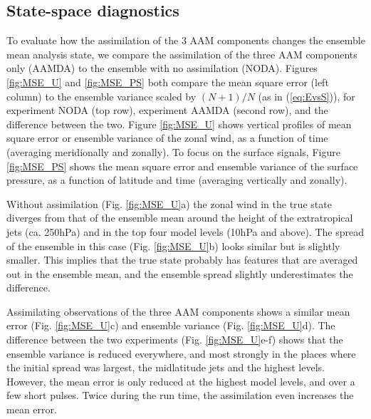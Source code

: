 \subsection{State-space diagnostics}
\label{sec:erpda}

To evaluate how the assimilation of the 3 AAM components changes the ensemble mean analysis state, we compare the assimilation of the three AAM components only (AAMDA) to the ensemble with no assimilation (NODA).
Figures \ref{fig:MSE_U} and \ref{fig:MSE_PS} both compare the mean square error (left column) to the ensemble variance scaled by $(N+1)/N$ (as in (\ref{eq:EvsS})), for experiment NODA (top row), experiment AAMDA (second row), and the difference between the two.
Figure \ref{fig:MSE_U} shows vertical profiles of mean square error or ensemble variance of the zonal wind, as a function of time (averaging meridionally and zonally). 
To focus on the surface signals, Figure \ref{fig:MSE_PS} shows the mean square error and ensemble variance of the surface pressure,  as a function of latitude and time (averaging vertically and zonally). 

Without assimilation (Fig. \ref{fig:MSE_U}a) the zonal wind in the true state diverges from that of the ensemble mean around the height of the extratropical jets (ca. 250hPa) and in the top four model levels (10hPa and above). 
The spread of the ensemble in this case (Fig. \ref{fig:MSE_U}b) looks similar but is slightly smaller. 
This implies that the true state probably has features that are averaged out in the ensemble mean, and the ensemble spread slightly underestimates the difference.

Assimilating observations of the three AAM components shows a similar mean error (Fig. \ref{fig:MSE_U}c) and ensemble variance (Fig. \ref{fig:MSE_U}d).
The difference between the two experiments (Fig. \ref{fig:MSE_U}e-f)  shows that the ensemble variance is reduced everywhere, and most strongly in the places where the initial spread was largest, the midlatitude jets and the highest levels. 
However, the mean error is only reduced at the highest model levels, and over a few short pulses. 
Twice during the run time, the assimilation even increases the mean error. 

